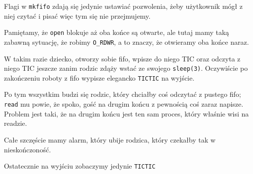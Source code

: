 Flagi w \texttt{mkfifo} zdają się jedynie ustawiać pozwolenia, żeby użytkownik mógł z niej czytać i pisać więc tym się nie przejmujemy.

Pamiętamy, że \texttt{open} blokuje aż oba końce są otwarte, ale tutaj mamy taką zabawną sytuację, że robimy \texttt{O\_RDWR}, a to znaczy, że otwieramy oba końce naraz.

W takim razie dziecko, otworzy sobie fifo, wpisze do niego TIC oraz odczyta z niego TIC jeszcze zanim rodzic zdąży wstać ze swojego \texttt{sleep(3)}.
Oczywiście po zakończeniu roboty z fifo wypisze elegancko \texttt{TICTIC}
na wyjście.

Po tym wszystkim budzi się rodzic, który chciałby coś odczytać z pustego fifo; \texttt{read} mu powie, że spoko, gość na drugim końcu z pewnością coś zaraz napisze.
Problem jest taki, że na drugim końcu jest ten sam proces, który właśnie wisi na readzie.

Całe szczęście mamy alarm, który ubije rodzica, który czekałby tak w nieskończoność.

Ostatecznie na wyjściu zobaczymy jedynie \texttt{TICTIC}
